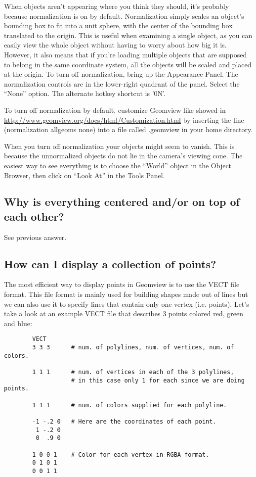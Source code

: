 \documentclass[12pt,a4paper]{article}
\begin{document}
        When objects aren't appearing where you think they should, it's probably
        because normalization is on by default. Normalization simply scales an
        object's bounding box to fit into a unit sphere, with the center of the
        bounding box translated to the origin. This is useful when examining a
        single object, as you can easily view the whole object without having to
        worry about how big it is. However, it also means that if you're loading
        multiple objects that are supposed to belong in the same coordinate
        system, all the objects will be scaled and placed at the origin. To turn
        off normalization, bring up the Appearance Panel. The normalization
        controls are in the lower-right quadrant of the panel. Select the ``None''
        option. The alternate hotkey shortcut is '0N'.

        To turn off normalization by default, customize Geomview
        like showed in \url{http://www.geomview.org/docs/html/Customization.html}
        by inserting the line (normalization allgeoms
        none) into a file called .geomview in your home directory.

        When you turn off normalization your objects might seem to vanish. This
        is because the unnormalized objects do not lie in the camera's viewing
        cone. The easiest way to see everything is to choose the ``World'' object
        in the Object Browser, then click on ``Look At'' in the Tools Panel.

    \subsection{Why is everything centered and/or on top of each other?}

        See previous answer.

    \subsection{How can I display a collection of points?}

        The most efficient way to display points in Geomview is to use the VECT
        file format. This file format is mainly used for building shapes made
        out of lines but we can also use it to specify lines that contain only
        one vertex (i.e. points). Let's take a look at an example VECT file that
        describes 3 points colored red, green and blue:
	\tiny
        \begin{verbatim}
        VECT
        3 3 3      # num. of polylines, num. of vertices, num. of colors.

        1 1 1      # num. of vertices in each of the 3 polylines,
                   # in this case only 1 for each since we are doing points.

        1 1 1      # num. of colors supplied for each polyline.

        -1 -.2 0   # Here are the coordinates of each point.
         1 -.2 0
         0  .9 0

        1 0 0 1    # Color for each vertex in RGBA format.
        0 1 0 1
        0 0 1 1
        \end{verbatim}
        \normalsize
        
\end{document}
